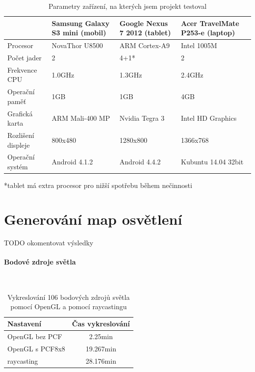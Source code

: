 \documentclass[11pt,twoside,a4paper]{book}
\begin{document}
\begin{table}[h!]
\begin{center}
\begin{tabular}{|p{35mm}|p{35mm}|p{35mm}|p{35mm}|}
\hline
& \textbf{Samsung Galaxy S3 mini (mobil)} & \textbf{Google Nexus 7 2012 (tablet)} & \textbf{Acer TravelMate P253-e (laptop)} \\
\hline
Procesor & NovaThor U8500 & ARM Cortex-A9 & Intel 1005M \\ \hline
Počet jader & 2 & 4+1* & 2 \\ \hline
Frekvence CPU & 1.0GHz & 1.3GHz & 2.4GHz \\ \hline
Operační paměť & 1GB & 1GB & 4GB \\ \hline
Grafická karta & ARM Mali-400 MP & Nvidia Tegra 3 & Intel HD Graphics \\ \hline
Rozlišení displeje & 800x480 & 1280x800 & 1366x768 \\ \hline
Operační systém & Android 4.1.2 & Android 4.4.2 & Kubuntu 14.04 32bit \\ \hline
\end{tabular}
\caption{Parametry zařízení, na kterých jsem projekt testoval}
*tablet má extra procesor pro nižší spotřebu během nečinnosti
\end{center}
\end{table}
\newpage

\section{Generování map osvětlení}
TODO okomentovat výsledky
\paragraph{Bodové zdroje světla}\ \ \\
\begin{table}[h!]
\begin{center}
\begin{tabular}{|p{50mm}|c|}
\hline
\textbf{Nastavení} & \textbf{Čas vykreslování} \\
\hline
OpenGL bez PCF & 2.25min\\ \hline
OpenGL s PCF8x8 & 19.267min\\ \hline
raycasting & 28.176min\\ \hline
\end{tabular}
\caption{Vykreslování 106 bodových zdrojů světla pomocí OpenGL a pomocí raycastingu}
\end{center}
\end{table}
\end{document}
